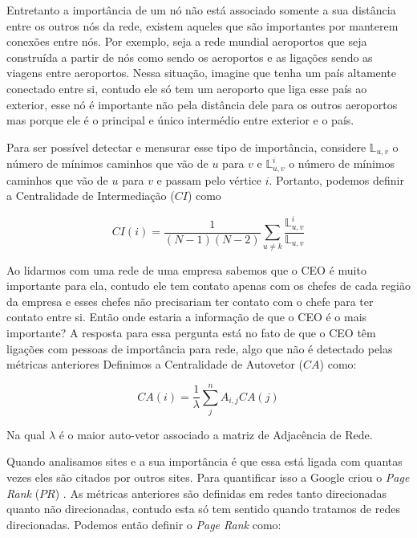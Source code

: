 Entretanto a importância de um nó não está associado somente a sua distância entre os outros nós da rede, existem aqueles que são importantes por manterem conexões entre nós. Por exemplo, seja a rede mundial aeroportos que seja construída a partir de nós como sendo os aeroportos e as ligações sendo as viagens entre aeroportos. Nessa situação, imagine que tenha um país altamente conectado entre si, contudo ele só tem um aeroporto que liga esse país ao exterior, esse nó é importante não pela distância dele para os outros aeroportos mas porque ele é o principal e único intermédio entre exterior e o país.

Para ser possível detectar e mensurar esse tipo de importância, considere $\mathbb{L}_{u,v}$ o número de mínimos caminhos que vão de $u$ para $v$ e $\mathbb{L}^{i}_{u,v}$ o número de mínimos caminhos que vão de $u$ para $v$ e passam pelo vértice $i$. Portanto, podemos definir a Centralidade de Intermediação ($CI$) como

\begin{equation}
  CI(i) = \frac{1}{(N - 1)(N - 2)} \sum\limits_{u \neq k} \frac{\mathbb{L}^{i}_{u,v}}{\mathbb{L}_{u,v}}
\end{equation}



Ao lidarmos com uma rede de uma empresa sabemos que o CEO é muito importante para ela, contudo ele tem contato apenas com os chefes de cada região da empresa e esses chefes não precisariam ter contato com o chefe para ter contato entre si. Então onde estaria a informação de que o CEO é o mais importante? A resposta para essa pergunta está no fato de que o CEO têm ligações com pessoas de importância para rede, algo que não é detectado pelas métricas anteriores Definimos a Centralidade de Autovetor ($CA$) como:

\begin{equation}
  CA(i) = \frac{1}{\lambda}\sum_{j}^nA_{i,j}CA(j)
\end{equation}

Na qual $\lambda$ é o maior auto-vetor associado a matriz de Adjacência de Rede.


Quando analisamos sites e a sua importância é que essa está ligada com quantas vezes eles são citados por outros sites. Para quantificar isso a Google criou o \textit{Page Rank} ($PR$) \cite{PageRank}. As métricas anteriores são definidas em redes tanto direcionadas quanto não direcionadas, contudo esta só tem sentido quando tratamos de redes direcionadas. Podemos então definir o \textit{Page Rank} como:

